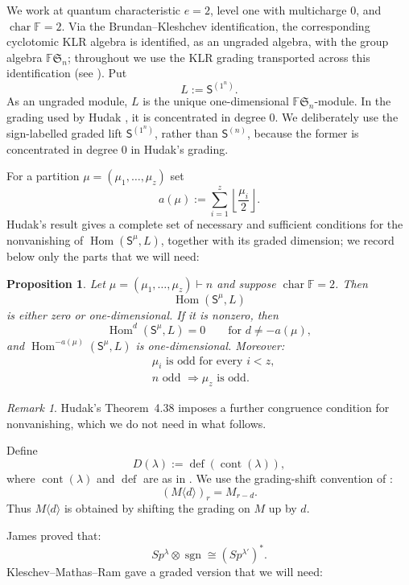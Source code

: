 \documentclass[11pt,reqno]{amsart}
\numberwithin{equation}{section}
\newtheorem{proposition}[theorem]{Proposition}
\theoremstyle{remark}
\newtheorem{remark}[theorem]{Remark}
\newcommand{\F}{\mathbb F}
\newcommand{\Sn}{\mathfrak S_n}
\newcommand{\Hom}{\operatorname{Hom}}
\newcommand{\RS}{\mathsf S}
\begin{document}
We work at quantum characteristic $e=2$, level one with multicharge $0$, and $\operatorname{char}\F=2$.  Via the Brundan--Kleshchev identification, the corresponding cyclotomic KLR algebra is identified, as an ungraded algebra, with the group algebra $\F\Sn$; throughout we use the KLR grading transported across this identification (see \cite{KMR}).  Put
\[
L:=\RS^{(1^n)}.
\]
As an ungraded module, $L$ is the unique one-dimensional $\F\Sn$-module.  In the grading used by Hudak \cite[Section~2.2]{Hudak}, it is concentrated in degree $0$.  We deliberately use the sign-labelled graded lift $\RS^{(1^n)}$, rather than $\RS^{(n)}$, because the former is concentrated in degree $0$ in Hudak's grading.

For a partition $\mu=(\mu_1,\ldots,\mu_z)$ set
\[
a(\mu):=\sum_{i=1}^z\left\lfloor\frac{\mu_i}{2}\right\rfloor.
\]
Hudak's result gives a complete set of necessary and sufficient conditions for the nonvanishing of $\Hom(\RS^\mu,L)$, together with its graded dimension; we record below only the parts that we will need:

\begin{proposition}\cite[Theorem~4.38]{Hudak}\label{prop:hudak}
Let $\mu=(\mu_1,\ldots,\mu_z)\vdash n$ and suppose $\operatorname{char}\F=2$.  Then
\[
\Hom(\RS^\mu,L)
\]
is either zero or one-dimensional.  If it is nonzero, then
\[
\Hom^d(\RS^\mu,L)=0\qquad\text{for }d\ne-a(\mu),
\]
and $\Hom^{-a(\mu)}(\RS^\mu,L)$ is one-dimensional.  Moreover:
\begin{align*}
&\mu_i\text{ is odd for every }i<z,\\
&n\text{ odd }\Longrightarrow \mu_z\text{ is odd}.
\end{align*}
\end{proposition}

\begin{remark}\label{rem:hudak-extra}
Hudak's Theorem~4.38 imposes a further congruence condition for nonvanishing, which we do not need in what follows.
\end{remark}
Define
\[
D(\lambda):=\operatorname{def}(\operatorname{cont}(\lambda)),
\]
where $\operatorname{cont}(\lambda)$ and $\operatorname{def}$ are as in
\cite[(2.5), (2.7)]{KMR}. We use the grading-shift convention of \cite{KMR}:
\[
(M\langle d\rangle)_r=M_{r-d}.
\]
Thus $M\langle d\rangle$ is obtained by shifting the grading on $M$
up by $d$.

James proved \cite[Theorem 8.15]{James} that:
$$Sp^\lambda \otimes \operatorname{sgn} \cong (Sp^{\lambda'})^*.$$ Kleschev--Mathas--Ram gave a graded version that we will need: 
\end{document}
